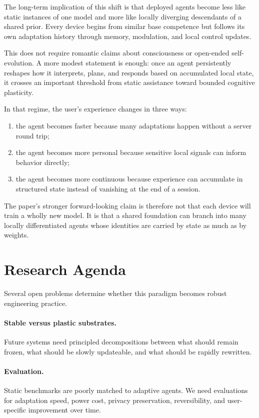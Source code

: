 \documentclass[11pt,a4paper]{article}
\begin{document}
The long-term implication of this shift is that deployed agents become less like static instances of one model and more like locally diverging descendants of a shared prior. Every device begins from similar base competence but follows its own adaptation history through memory, modulation, and local control updates.

This does not require romantic claims about consciousness or open-ended self-evolution. A more modest statement is enough: once an agent persistently reshapes how it interprets, plans, and responds based on accumulated local state, it crosses an important threshold from static assistance toward bounded cognitive plasticity.

In that regime, the user's experience changes in three ways:
\begin{enumerate}[noitemsep]
    \item the agent becomes faster because many adaptations happen without a server round trip;
    \item the agent becomes more personal because sensitive local signals can inform behavior directly;
    \item the agent becomes more continuous because experience can accumulate in structured state instead of vanishing at the end of a session.
\end{enumerate}

The paper's stronger forward-looking claim is therefore not that each device will train a wholly new model. It is that a shared foundation can branch into many locally differentiated agents whose identities are carried by state as much as by weights.

\section{Research Agenda}

Several open problems determine whether this paradigm becomes robust engineering practice.

\paragraph{Stable versus plastic substrates.}
Future systems need principled decompositions between what should remain frozen, what should be slowly updateable, and what should be rapidly rewritten.

\paragraph{Evaluation.}
Static benchmarks are poorly matched to adaptive agents. We need evaluations for adaptation speed, power cost, privacy preservation, reversibility, and user-specific improvement over time.
\end{document}
